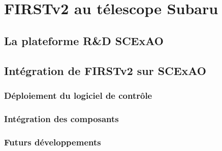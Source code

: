 \newpage\thispagestyle{empty}
\chapter{FIRSTv2 au télescope Subaru}
\label{sec:FIRSTv2Subaru}
\setcounter{figure}{0}
\setcounter{table}{0}

\begingroup
\hypersetup{linkcolor=black}
\minitoc
\endgroup

\clearpage
\section{La plateforme R\&D SCExAO}

\section{Intégration de FIRSTv2 sur SCExAO}

\subsection{Déploiement du logiciel de contrôle}

\subsection{Intégration des composants}

\subsection{Futurs développements}



